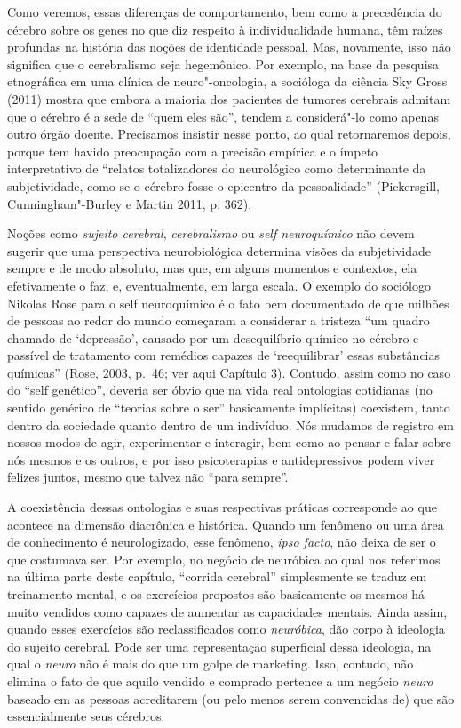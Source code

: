 Como veremos, essas diferenças de comportamento, bem como a precedência
do cérebro sobre os genes no que diz respeito à individualidade humana,
têm raízes profundas na história das noções de identidade pessoal. Mas,
novamente, isso não significa que o cerebralismo seja hegemônico. Por
exemplo, na base da pesquisa etnográfica em uma clínica de
neuro"-oncologia, a socióloga da ciência Sky Gross (2011) mostra que
embora a maioria dos pacientes de tumores cerebrais admitam que o
cérebro é a sede de ``quem eles são'', tendem a considerá"-lo como apenas
outro órgão doente. Precisamos insistir nesse ponto, ao qual
retornaremos depois, porque tem havido preocupação com a precisão
empírica e o ímpeto interpretativo de ``relatos totalizadores do
neurológico como determinante da subjetividade, como se o cérebro fosse
o epicentro da pessoalidade'' (Pickersgill, Cunningham"-Burley e Martin
2011, p. 362).

Noções como \emph{sujeito cerebral}, \emph{cerebralismo} ou \emph{self
neuroquímico} não devem sugerir que uma perspectiva neurobiológica
determina visões da subjetividade sempre e de modo absoluto, mas que, em
alguns momentos e contextos, ela efetivamente o faz, e, eventualmente,
em larga escala. O exemplo do sociólogo Nikolas Rose para o self
neuroquímico é o fato bem documentado de que milhões de pessoas ao redor
do mundo começaram a considerar a tristeza ``um quadro chamado de
`depressão', causado por um desequilíbrio químico no cérebro e passível
de tratamento com remédios capazes de `reequilibrar' essas substâncias
químicas'' (Rose, 2003, p.~46; ver aqui Capítulo 3). Contudo, assim como
no caso do ``self genético'', deveria ser óbvio que na vida real
ontologias cotidianas (no sentido genérico de ``teorias sobre o ser''
basicamente implícitas) coexistem, tanto dentro da sociedade quanto
dentro de um indivíduo. Nós mudamos de registro em nossos modos de agir,
experimentar e interagir, bem como ao pensar e falar sobre nós mesmos e
os outros, e por isso psicoterapias e antidepressivos podem viver
felizes juntos, mesmo que talvez não ``para sempre''.

A coexistência dessas ontologias e suas respectivas práticas corresponde
ao que acontece na dimensão diacrônica e histórica. Quando um fenômeno
ou uma área de conhecimento é neurologizado, esse fenômeno, \emph{ipso
facto}, não deixa de ser o que costumava ser. Por exemplo, no negócio de
neuróbica ao qual nos referimos na última parte deste capítulo,
``corrida cerebral'' simplesmente se traduz em treinamento mental, e os
exercícios propostos são basicamente os mesmos há muito vendidos como
capazes de aumentar as capacidades mentais. Ainda assim, quando esses
exercícios são reclassificados como \emph{neuróbica}, dão corpo à
ideologia do sujeito cerebral. Pode ser uma representação superficial
dessa ideologia, na qual o \emph{neuro} não é mais do que um golpe de
marketing. Isso, contudo, não elimina o fato de que aquilo vendido e
comprado pertence a um negócio \emph{neuro} baseado em as pessoas
acreditarem (ou pelo menos serem convencidas de) que são essencialmente
seus cérebros.

